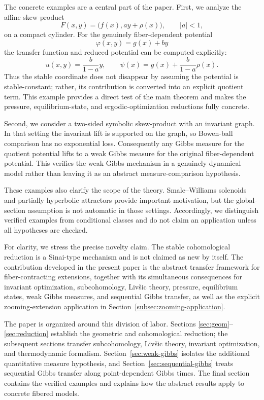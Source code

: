 \documentclass[11pt,a4paper]{article}
\begin{document}
The concrete examples are a central part of the paper. First, we analyze
the affine skew-product
\[
F(x,y)=\bigl(f(x),ay+\rho(x)\bigr),\qquad |a|<1,
\]
on a compact cylinder. For the genuinely fiber-dependent potential
\[
\varphi(x,y)=g(x)+by
\]
the transfer function and reduced potential can be computed explicitly:
\[
u(x,y)=\frac{b}{1-a}y,
\qquad
\psi(x)=g(x)+\frac{b}{1-a}\rho(x).
\]
Thus the stable coordinate does not disappear by assuming the potential is
stable-constant; rather, its contribution is converted into an explicit
quotient term. This example provides a direct test of the main theorem and
makes the pressure, equilibrium-state, and ergodic-optimization reductions
fully concrete.

Second, we consider a two-sided symbolic skew-product with an invariant
graph. In that setting the invariant lift is supported on the graph, so
Bowen-ball comparison has no exponential loss. Consequently any Gibbs
measure for the quotient potential lifts to a weak Gibbs measure for the
original fiber-dependent potential. This verifies the weak Gibbs mechanism
in a genuinely dynamical model rather than leaving it as an abstract
measure-comparison hypothesis.

These examples also clarify the scope of the theory. Smale--Williams
solenoids and partially hyperbolic attractors provide important motivation,
but the global-section assumption is not automatic in those settings.
Accordingly, we distinguish verified examples from conditional classes and
do not claim an application unless all hypotheses are checked.

For clarity, we stress the precise novelty claim. The stable cohomological
reduction is a Sinai-type mechanism and is not claimed as new by itself. The
contribution developed in the present paper is the abstract transfer framework
for fiber-contracting extensions, together with its simultaneous consequences
for invariant optimization, subcohomology, Liv\v{s}ic theory, pressure,
equilibrium states, weak Gibbs measures, and sequential Gibbs transfer, as well
as the explicit zooming-extension application in
Section~\ref{subsec:zooming-application}.

The paper is organized around this division of labor. Sections
\ref{sec:geom}--\ref{sec:reduction} establish the geometric and
cohomological reduction; the subsequent sections transfer subcohomology,
Liv\v{s}ic theory, invariant optimization, and thermodynamic formalism.
Section~\ref{sec:weak-gibbs} isolates the additional quantitative measure
hypothesis, and Section~\ref{sec:sequential-gibbs} treats sequential Gibbs
transfer along point-dependent Gibbs times. The final section contains the verified examples and explains
how the abstract results apply to concrete fibered models.
\end{document}
